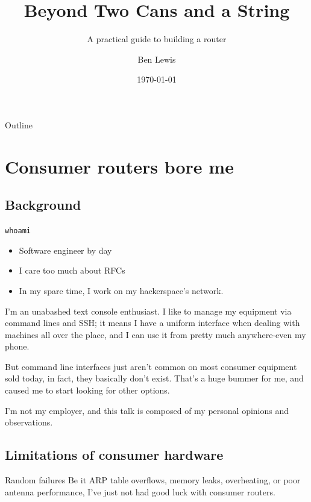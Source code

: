 \documentclass[bigger]{beamer}
\author{Ben Lewis}
\date{\today}
\title{Beyond Two Cans and a String}
\subtitle{A practical guide to building a router}
\begin{document}
\maketitle
\begin{frame}{Outline}
\tableofcontents
\end{frame}


\section{Consumer routers bore me}
\label{sec:org769d52d}

\subsection{Background}
\label{sec:orgb37081c}

\begin{frame}[fragile,label={sec:org06c16c6}]{\texttt{whoami}}
  \begin{itemize}
  \item Software engineer by day
  \item I care too much about RFCs
  \item In my spare time, I work on my hackerspace's network.
  \end{itemize}
\begin{notes}
I'm an unabashed text console enthusiast. I like to manage my equipment via
command lines and SSH; it means I have a uniform interface when dealing with
machines all over the place, and I can use it from pretty much anywhere-even my
phone.

But command line interfaces just aren't common on most consumer equipment sold
today, in fact, they basically don't exist. That's a huge bummer for me, and
caused me to start looking for other options.
\end{notes}

\end{frame}

\begin{frame}
  I'm not my employer, and this talk is composed of my personal opinions and observations.
\end{frame}

\subsection{Limitations of consumer hardware}
\label{sec:orgbbeeef6}

\begin{frame}[label={sec:org6db040a}]{Random failures}
Be it ARP table overflows, memory leaks, overheating, or poor antenna
performance, I've just not had good luck with consumer routers.
\end{frame}
\end{document}
